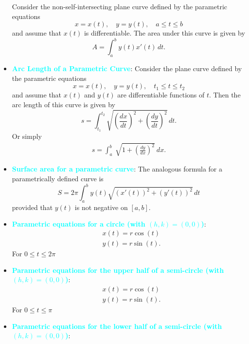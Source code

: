 \documentclass{report}
\begin{document}
\begin{itemize}
            Consider the non-self-intersecting plane curve defined by the parametric equations
            \[
                x = x(t), \quad y = y(t), \quad a \leq t \leq b
            \]
            and assume that \( x(t) \) is differentiable. The area under this curve is given by
            \[
                A = \int_{a}^{b} y(t) x'(t) \, dt.
            \]
        \item \textbf{\textcolor{cyan}{Arc Length of a Parametric Curve}}:
            Consider the plane curve defined by the parametric equations
            \[
                x = x(t), \quad y = y(t), \quad t_1 \leq t \leq t_2
            \]
            and assume that \( x(t) \) and \( y(t) \) are differentiable functions of \( t \). Then the arc length of this curve is given by
            \[
                s = \int_{t_1}^{t_2} \sqrt{\left(\frac{dx}{dt}\right)^2 + \left(\frac{dy}{dt}\right)^2} \, dt.
            \]
            Or simply
            \begin{align*}
                s = \int_{a}^{b}\ \sqrt{1 + \left(\frac{dy}{dx}\right)^{2}}\ dx
            .\end{align*}
        \item \textbf{\textcolor{cyan}{Surface area for a parametric curve}}:
            The analogous formula for a parametrically defined curve is
            \[
                S = 2\pi \int_{a}^{b} y(t) \sqrt{(x'(t))^2 + (y'(t))^2} \, dt
            \]
            provided that \( y(t) \) is not negative on \([a, b]\).
        \item \textbf{\textcolor{cyan}{Parametric equations for a circle (with $(h,k) = (0,0)$)}}:
            \begin{align*}
                &x(t) = r\cos{(t)} \\
                &y(t) = r\sin{(t)}
            .\end{align*}
            For $0 \leq t \leq 2\pi $
        \item \textbf{\textcolor{cyan}{Parametric equations for the upper half of a semi-circle (with $(h,k) = (0,0)$)}}:
            \begin{align*}
                &x(t) = r\cos{(t)} \\
                &y(t) = r\sin{(t)}
            .\end{align*}
            For $0 \leq t \leq \pi $
        \item \textbf{\textcolor{cyan}{Parametric equations for the lower half of a semi-circle (with $(h,k) = (0,0)$)}}:
            \begin{align*}

\end{align*}
\end{itemize}
\end{document}
